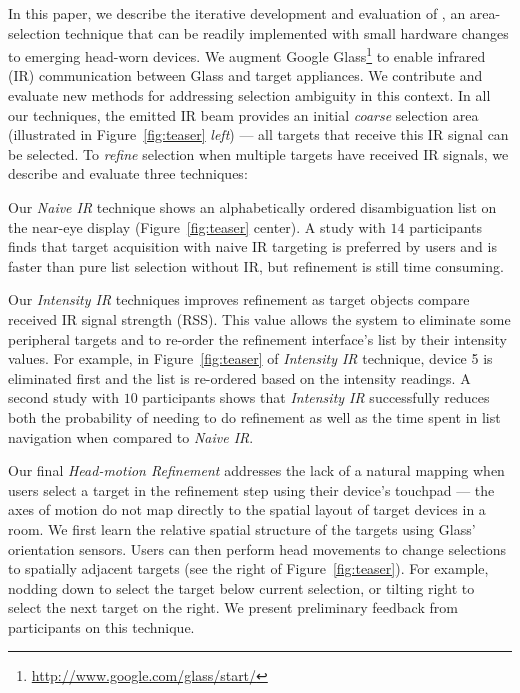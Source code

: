 In this paper, we describe the iterative development and evaluation of \systemnamenospace, an area-selection technique that can be readily implemented with small hardware changes to emerging head-worn devices. We augment Google Glass\footnote{\url{http://www.google.com/glass/start/}} to enable infrared (IR) communication between Glass and target appliances. We contribute and evaluate new methods for addressing selection ambiguity in this context. In all our techniques, the emitted IR beam %
 provides an initial {\em coarse} selection area (illustrated in Figure~\ref{fig:teaser} {\em left}) --- all targets that receive this IR signal can be selected. To {\em refine} selection when multiple targets have received IR signals, we describe and evaluate three techniques:

 Our {\em Naive IR} technique shows an alphabetically ordered disambiguation list on the near-eye display (Figure~\ref{fig:teaser} center). A study with $14$ participants finds that target acquisition with naive IR targeting is preferred by users and is faster than pure list selection without IR, but refinement is still time consuming.

Our {\em Intensity IR} techniques improves refinement as target objects compare received IR signal strength (RSS). This value allows the system to eliminate some peripheral targets and to re-order the refinement interface's list by their intensity values. For example, in Figure~\ref{fig:teaser} of {\em Intensity IR} technique, device 5 is eliminated first and the list is re-ordered based on the intensity readings. A second study with $10$ participants shows that {\em Intensity IR} successfully reduces both the probability of needing to do refinement as well as the time spent in list navigation when compared to {\em Naive IR}.

Our final {\em Head-motion Refinement} addresses the lack of a natural mapping when users select a target in the refinement step using their device's touchpad --- the axes of motion do not map directly to the spatial layout of target devices in a room. We first learn the relative spatial structure of the targets using Glass' orientation sensors. Users can then perform head movements to change selections to spatially adjacent targets (see the right of Figure~\ref{fig:teaser}). For example, nodding down to select the target below current selection, or tilting right to select the next target on the right. We present preliminary feedback from participants on this technique.

